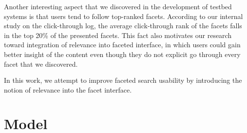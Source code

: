 Another interesting aspect that we discovered in the development of testbed
systems is that users tend to follow top-ranked facets.  According to our
internal study on the click-through log, the average click-through rank of the
facets falls in the top 20\% of the presented facets.  This fact also motivates
our research toward integration of relevance into faceted interface, in which
users could gain better insight of the content even though they do not explicit
go through every facet that we discovered.

In this work, we attempt to improve faceted search usability by introducing the
notion of relevance into the facet interface.  


\section{Model}


